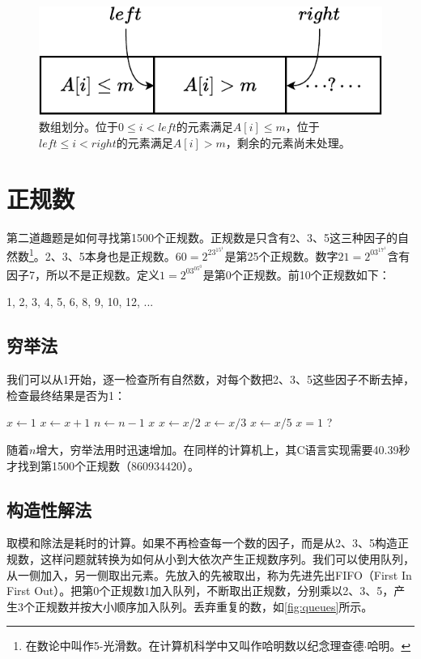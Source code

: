 \documentclass[b5paper, punct=kaiming]{ctexart}
\begin{document}
\begin{figure}[htbp]
  \centering
  \includegraphics[scale=0.7]{img/partition-by}  %
  \caption{数组划分。位于$0 \leq i < left$的元素满足$A[i] \leq m$，位于$left \leq i < right$的元素满足$A[i] > m$，剩余的元素尚未处理。}
  \label{fig:divide}
\end{figure}

\section*{正规数}

第二道趣题是如何寻找第1500个正规数。正规数是只含有2、3、5这三种因子的自然数\footnote{在数论中叫作5-光滑数。在计算机科学中又叫作哈明数以纪念理查德$\cdot$哈明。}。2、3、5本身也是正规数。$60 = 2^23^15^1$是第25个正规数。数字$21 = 2^03^17^1$含有因子7，所以不是正规数。定义$1=2^03^05^0$是第0个正规数。前10个正规数如下：

1, 2, 3, 4, 5, 6, 8, 9, 10, 12, ...

\subsection*{穷举法}
我们可以从1开始，逐一检查所有自然数，对每个数把2、3、5这些因子不断去掉，检查最终结果是否为1：

\begin{algorithmic}[1]
  \State $x \gets 1$
    \State $x \gets x + 1$
      \State $n \gets n - 1$
    \EndIf
  \EndWhile
  \State \Return $x$
\EndFunction
\Statex
{}
    \State $x \gets x / 2$
  \EndWhile
    \State $x \gets x / 3$
  \EndWhile
    \State $x \gets x / 5$
  \EndWhile
  \State \Return $x = 1$ ?
\EndFunction
\end{algorithmic}

随着$n$增大，穷举法用时迅速增加。在同样的计算机上，其C语言实现需要40.39秒才找到第1500个正规数（860934420）。

\subsection*{构造性解法}
取模和除法是耗时的计算\cite{Bentley}。如果不再检查每一个数的因子，而是从2、3、5构造正规数，这样问题就转换为如何从小到大依次产生正规数序列。我们可以使用队列，从一侧加入，另一侧取出元素。先放入的先被取出，称为先进先出FIFO（First In First Out）。把第0个正规数1加入队列，不断取出正规数，分别乘以2、3、5，产生3个正规数并按大小顺序加入队列。丢弃重复的数，如\cref{fig:queues}所示。
\end{document}
